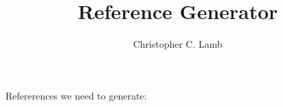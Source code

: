\documentclass[10pt,letterpaper]{article}
\author{Christopher C. Lamb}
\title{Reference Generator}
\begin{document}
Refererences we need to generate:
\cite{6274040}
\cite{Lamb:2011:DSL:2046631.2046641}
\cite{ctrl:lamb-SOSE}
\cite{6008751}
\cite{Jamkhedkar:2010:IUM:1866870.1866885}



\end{document}
